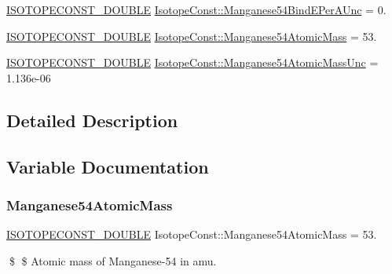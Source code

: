 \begin{DoxyCompactItemize}
\mbox{\hyperlink{group___isotope_const-_macros_ga8f45a7272ce02c0b4c65c44636ed719a}{I\+S\+O\+T\+O\+P\+E\+C\+O\+N\+S\+T\+\_\+\+D\+O\+U\+B\+LE}} \mbox{\hyperlink{group___isotope_const-_manganese-_mn54_ga52099c7790e04d50c96822333f279fb0}{Isotope\+Const\+::\+Manganese54\+Bind\+E\+Per\+A\+Unc}} = 0.
\item 
\mbox{\hyperlink{group___isotope_const-_macros_ga8f45a7272ce02c0b4c65c44636ed719a}{I\+S\+O\+T\+O\+P\+E\+C\+O\+N\+S\+T\+\_\+\+D\+O\+U\+B\+LE}} \mbox{\hyperlink{group___isotope_const-_manganese-_mn54_ga6c69b47066907d39c82bc8d8380450aa}{Isotope\+Const\+::\+Manganese54\+Atomic\+Mass}} = 53.
\item 
\mbox{\hyperlink{group___isotope_const-_macros_ga8f45a7272ce02c0b4c65c44636ed719a}{I\+S\+O\+T\+O\+P\+E\+C\+O\+N\+S\+T\+\_\+\+D\+O\+U\+B\+LE}} \mbox{\hyperlink{group___isotope_const-_manganese-_mn54_gac176ef718ff9640c8997d19b4647b7c6}{Isotope\+Const\+::\+Manganese54\+Atomic\+Mass\+Unc}} = 1.\+136e-\/06
\end{DoxyCompactItemize}


\subsection{Detailed Description}


\subsection{Variable Documentation}
\mbox{\label{group___isotope_const-_manganese-_mn54_ga6c69b47066907d39c82bc8d8380450aa}} 
\subsubsection{\texorpdfstring{Manganese54\+Atomic\+Mass}{Manganese54AtomicMass}}
{\footnotesize\ttfamily \mbox{\hyperlink{group___isotope_const-_macros_ga8f45a7272ce02c0b4c65c44636ed719a}{I\+S\+O\+T\+O\+P\+E\+C\+O\+N\+S\+T\+\_\+\+D\+O\+U\+B\+LE}} Isotope\+Const\+::\+Manganese54\+Atomic\+Mass = 53.}

\$ \$ Atomic mass of Manganese-\/54 in amu. \mbox{\label{group___isotope_const-_manganese-_mn54_gac176ef718ff9640c8997d19b4647b7c6}} 
